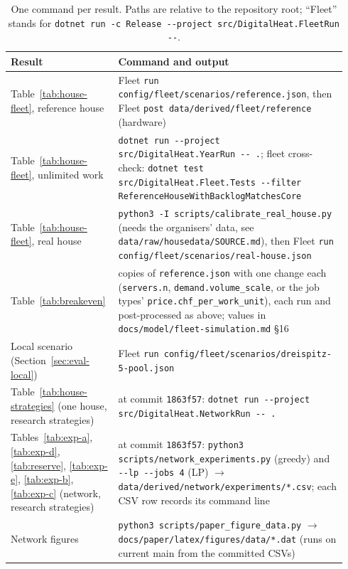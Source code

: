 \begin{table}[ht]
  \centering
  \caption{One command per result. Paths are relative to the repository root; ``Fleet'' stands for
    \texttt{dotnet run -c Release -{}-project src/DigitalHeat.FleetRun -{}-}.}
  \label{tab:repro}
  \begin{tabular}{>{\raggedright\arraybackslash}p{0.28\linewidth}>{\raggedright\arraybackslash}p{0.66\linewidth}}
    \toprule
    Result & Command and output \\
    \midrule
    Table~\ref{tab:house-fleet}, reference house &
      Fleet \texttt{run config/fleet/scenarios/reference.json}, then Fleet \texttt{post data/derived/fleet/reference} (hardware) \\
    Table~\ref{tab:house-fleet}, unlimited work &
      \texttt{dotnet run -{}-project src/DigitalHeat.YearRun -{}- .}; fleet cross-check:
      \texttt{dotnet test src/DigitalHeat.Fleet.Tests -{}-filter ReferenceHouseWithBacklogMatchesCore} \\
    Table~\ref{tab:house-fleet}, real house &
      \texttt{python3 -I scripts/calibrate\_real\_house.py} (needs the organisers' data, see
      \texttt{data/raw/housedata/SOURCE.md}), then Fleet \texttt{run config/fleet/scenarios/real-house.json} \\
    Table~\ref{tab:breakeven} &
      copies of \texttt{reference.json} with one change each (\texttt{servers.n},
      \texttt{demand.volume\_scale}, or the job types' \texttt{price.chf\_per\_work\_unit}), each run and
      post-processed as above; values in \texttt{docs/model/fleet-simulation.md} \S16 \\
    Local scenario (Section~\ref{sec:eval-local}) &
      Fleet \texttt{run config/fleet/scenarios/dreispitz-5-pool.json} \\
    Table~\ref{tab:house-strategies} (one house, research strategies) &
      at commit \texttt{1863f57}: \texttt{dotnet run -{}-project src/DigitalHeat.NetworkRun -{}- .} \\
    Tables~\ref{tab:exp-a}, \ref{tab:exp-d}, \ref{tab:reserve}, \ref{tab:exp-e}, \ref{tab:exp-b}, \ref{tab:exp-c} (network, research strategies) &
      at commit \texttt{1863f57}: \texttt{python3 scripts/network\_experiments.py} (greedy) and
      \texttt{-{}-lp -{}-jobs 4} (LP) $\to$ \texttt{data/derived/network/experiments/*.csv};
      each CSV row records its command line \\
    Network figures &
      \texttt{python3 scripts/paper\_figure\_data.py} $\to$ \texttt{docs/paper/latex/figures/data/*.dat} (runs on current main from the committed CSVs) \\

\end{tabular}
\end{table}

